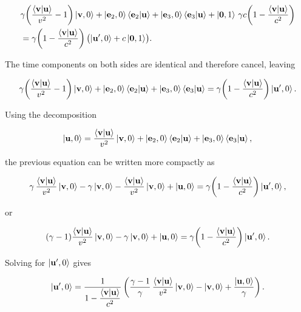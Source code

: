 \documentclass[12pt]{article}
\begin{document}
\[
  \begin{aligned}
    &\gamma\!\left(
      \frac{\ip{\vb{v}}{\vb{u}}}{v^2} - 1
    \right)\ket{\vb{v},0}
    + \ket{\vb{e}_2,0}\ip{\vb{e}_2}{\vb{u}}
    + \ket{\vb{e}_3,0}\ip{\vb{e}_3}{\vb{u}}
    + \ket{\vb{0},1}\,
      \gamma c\!\left(
        1 - \frac{\ip{\vb{v}}{\vb{u}}}{c^2}
      \right)
    \\
    &=
    \gamma\!\left(
      1 - \frac{\ip{\vb{v}}{\vb{u}}}{c^2}
    \right)
    \bigl(
      \ket{\vb{u}',0}+c\ket{\vb{0},1}
    \bigr).
  \end{aligned}
\]

The time components on both sides are identical and therefore cancel, leaving

\[
  \gamma\!\left(
    \frac{\ip{\vb{v}}{\vb{u}}}{v^2} - 1
  \right)\ket{\vb{v},0}
  + \ket{\vb{e}_2,0}\ip{\vb{e}_2}{\vb{u}}
  + \ket{\vb{e}_3,0}\ip{\vb{e}_3}{\vb{u}}
  =
  \gamma\!\left(
    1 - \frac{\ip{\vb{v}}{\vb{u}}}{c^2}
  \right)\ket{\vb{u}',0}.
\]

Using the decomposition

\[
  \ket{\vb{u},0}
  =
  \frac{\ip{\vb{v}}{\vb{u}}}{v^2}\ket{\vb{v},0}
  +
  \ket{\vb{e}_2,0}\ip{\vb{e}_2}{\vb{u}}
  +
  \ket{\vb{e}_3,0}\ip{\vb{e}_3}{\vb{u}},
\]

the previous equation can be written more compactly as

\[
  \gamma\,
  \frac{\ip{\vb{v}}{\vb{u}}}{v^2}\ket{\vb{v},0}
  -
  \gamma\ket{\vb{v},0}
  -
  \frac{\ip{\vb{v}}{\vb{u}}}{v^2}\ket{\vb{v},0}
  +
  \ket{\vb{u},0}
  =
  \gamma\!\left(
    1 - \frac{\ip{\vb{v}}{\vb{u}}}{c^2}
  \right)\ket{\vb{u}',0},
\]

or

\begin{equation}
  (\gamma - 1)
  \frac{\ip{\vb{v}}{\vb{u}}}{v^2}\ket{\vb{v},0}
  -
  \gamma\ket{\vb{v},0}
  +
  \ket{\vb{u},0}
  =
  \gamma\!\left(
    1 - \frac{\ip{\vb{v}}{\vb{u}}}{c^2}
  \right)\ket{\vb{u}',0}.
  \label{eq:velocities_relationship}
\end{equation}

Solving for $\ket{\vb{u}',0}$ gives

\begin{equation}
  \ket{\vb{u}',0}
  =
  \frac{1}{
    \displaystyle
    1 - \frac{\ip{\vb{v}}{\vb{u}}}{c^2}
  }
  \left(
    \frac{\gamma-1}{\gamma}\,
    \frac{\ip{\vb{v}}{\vb{u}}}{v^2}\ket{\vb{v},0}
    -
    \ket{\vb{v},0}
    +
    \frac{\ket{\vb{u},0}}{\gamma}
  \right).
  \label{eq:inverse_velocity_composition}
\end{equation}
\end{document}

